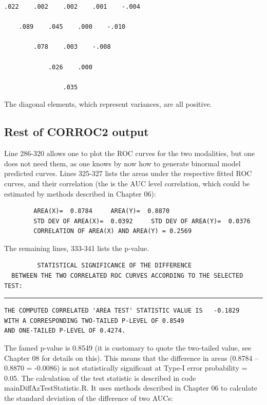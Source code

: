 \documentclass[
]{book}
\begin{document}
\begin{verbatim}
.022    .002    .002    .001    -.004

    .089    .045    .000    -.010

        .078    .003    -.008

            .026    .000

                .035
\end{verbatim}

The diagonal elements, which represent variances, are all positive.

\hypertarget{bivariate-binormal-model-corroc2-output-restof}{%
\subsection{Rest of CORROC2 output}\label{bivariate-binormal-model-corroc2-output-restof}}

Line 286-320 allows one to plot the ROC curves for the two modalities, but one does not need them, as one knows by now how to generate binormal model predicted curves. Lines 325-327 lists the areas under the respective fitted ROC curves, and their correlation (the is the AUC level correlation, which could be estimated by methods described in Chapter 06):

\begin{verbatim}
        AREA(X)=  0.8784     AREA(Y)=  0.8870
        STD DEV OF AREA(X)=  0.0392     STD DEV OF AREA(Y)=  0.0376
        CORRELATION OF AREA(X) AND AREA(Y) = 0.2569
\end{verbatim}

The remaining lines, 333-341 lists the p-value.

\begin{verbatim}
         STATISTICAL SIGNIFICANCE OF THE DIFFERENCE
  BETWEEN THE TWO CORRELATED ROC CURVES ACCORDING TO THE SELECTED TEST:
\end{verbatim}

\begin{center}\rule{0.5\linewidth}{0.5pt}\end{center}

\begin{verbatim}
THE COMPUTED CORRELATED 'AREA TEST' STATISTIC VALUE IS   -0.1829
WITH A CORRESPONDING TWO-TAILED P-LEVEL OF 0.8549
AND ONE-TAILED P-LEVEL OF 0.4274.
\end{verbatim}

The famed p-value is 0.8549 (it is customary to quote the two-tailed value, see Chapter 08 for details on this). This means that the difference in areas (0.8784 -- 0.8870 = -0.0086) is not statistically significant at Type-I error probability = 0.05. The calculation of the test statistic is described in code mainDiffAzTestStatistic.R. It uses methods described in Chapter 06 to calculate the standard deviation of the difference of two AUCs:
\end{document}

